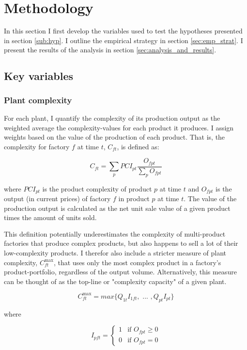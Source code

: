 \documentclass[11pt]{article}
\begin{document}
\newpage

\section{Methodology}%
\label{sub:methodology}
In this section I first develop the variables used to test the hypotheses presented in section \ref{sub:hyp}. I outline the empirical strategy in section \ref{sec:emp_strat}. I present the results of the analysis in section \ref{sec:analysis_and_results}.

\subsection{Key variables}%
\label{sub:key_variables}

\subsubsection{Plant complexity}%
\label{sub:plant_complexity}

For each plant, I quantify the complexity of its production output as the weighted average the complexity-values for each product it produces. I assign weights based on the value of the production of each product. That is, the complexity for factory \(f\) at time \(t\), \(C_{ft}\), is defined as:

\[
C_{ft} = \sum_p PCI_{pt} \frac{O_{fpt}}{\sum_p O_{fpt}}
\] 

where \(PCI_{pt}\) is the product complexity of product \(p\) at time \(t\) and \(O_{fpt}\) is the output (in current prices) of factory \(f\) in product \(p\) at time \(t\). The value of the production output is calculated as the net unit sale value of a given product times the amount of units sold. 

This definition potentially underestimates the complexity of multi-product factories that produce complex products, but also happens to sell a lot of their low-complexity products. I therefor also include a stricter measure of plant complexity, \(C^{\text{max}}_{ft}\), that uses only the most complex product in a factory's product-portfolio, regardless of the output volume. Alternatively, this measure can be thought of as the top-line or "complexity capacity" of a given plant. 

\[
C^{\text{max}}_{ft} = max \{ Q_{1t} I_{1ft}, \text{ ... }, Q_{pt} I_{pt} \}
\]

where

\[
I_{pft} = \begin{cases}
 1 & \text{if } O_{fpt} \geq 0 \\
 0 & \text{if } O_{fpt} = 0
\end{cases}
\]
\end{document}
